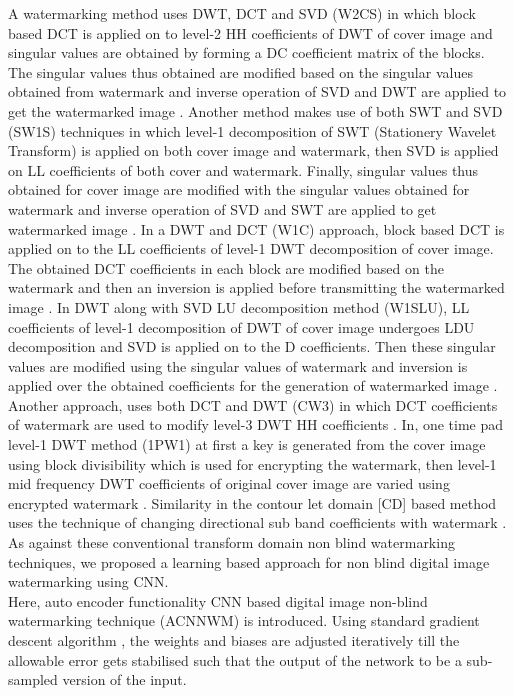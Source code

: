 A watermarking method uses DWT, DCT and SVD (W2CS) in which block based DCT is applied on to level-2 HH coefficients of DWT of cover image and singular values are obtained by forming a DC coefficient matrix of the blocks. The singular values thus obtained are modified based on the singular values obtained from watermark and inverse operation of SVD and DWT are applied to get the watermarked image \cite{P4}. Another method makes use of both SWT and SVD (SW1S) techniques in which level-1 decomposition of SWT (Stationery Wavelet Transform) is applied on both cover image and watermark, then SVD is applied on LL coefficients of both cover and watermark. Finally, singular values thus obtained for cover image are modified with the singular values obtained for watermark and inverse operation of SVD and SWT are applied to get watermarked image \cite{P5}. In a DWT and DCT (W1C) approach, block based DCT is applied on to the LL coefficients of level-1 DWT decomposition of cover image. The obtained DCT coefficients in each block are modified based on the watermark and then an inversion is applied before transmitting the watermarked image \cite{P6}. In DWT along with SVD LU decomposition method (W1SLU), LL coefficients of level-1 decomposition of DWT of cover image undergoes LDU decomposition and SVD is applied on to the D coefficients. Then these singular values are modified using the singular values of watermark and inversion is applied over the obtained coefficients for the generation of watermarked image \cite{P7}. Another approach, uses both DCT and DWT (CW3) in which DCT coefficients of watermark are used to modify level-3 DWT HH coefficients \cite{P20}. In, one time pad level-1 DWT method (1PW1) at first a key is generated from the cover image using block divisibility which is used for encrypting the watermark, then level-1 mid frequency DWT coefficients of original cover image are varied using encrypted watermark \cite{P21}. Similarity in the contour let domain [CD] based method uses the technique of changing directional sub band coefficients with watermark \cite{P22}. As against these conventional transform domain non blind watermarking techniques, we proposed a learning based approach for non blind digital image watermarking using CNN.\\

  Here, auto encoder functionality CNN based digital image non-blind watermarking technique (ACNNWM) is introduced. Using standard gradient descent algorithm \cite{P14}, the weights and biases are adjusted iteratively till the allowable error gets stabilised such that the output of the network to be a sub-sampled version of the input. \\
  
